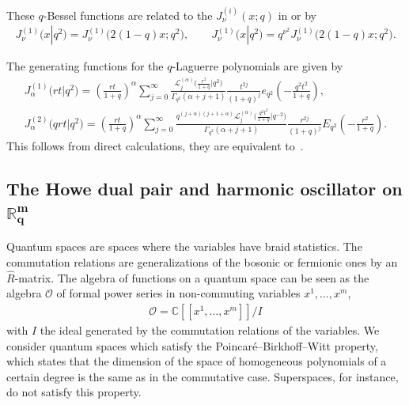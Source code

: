 \documentclass[pdftex]{sigma}
\newcommand{\mR}{\mathbb{R}}
\newcommand{\mC}{\mathbb{C}}
\newcommand{\cL}{\mathcal{L}}
\newcommand{\cO}{\mathcal{O}}
\numberwithin{equation}{section}
\begin{document}
These $q$-Bessel functions are related to the $J^{(i)}_\nu(x;q)$ in \cite[(1.13) and (1.17)]{MR0649849}  or \cite[Exercise~1.24]{MR1052153} by
\begin{gather*}
J^{(1)}_\nu\big(x|q^2\big)=J^{(1)}_\nu\big({2(1-q)}x;q^2\big),\qquad J^{(1)}_\nu\big(x|q^2\big)=q^{\nu^2}J^{(1)}_\nu\big(2(1-q)x;q^2\big).
\end{gather*}



The generating functions for the $q$-Laguerre polynomials are given by
\begin{gather}
\label{BesselLag1}
J_\alpha^{(1)}\big(rt|q^2\big) = \left(\frac{rt}{1+q}\right)^{\alpha}\sum_{j=0}^\infty\frac{\cL_j^{(\alpha)}\big(\frac{r^2}{1+q}|q^2\big)}{\Gamma_{q^2}(\alpha+j+1)}
\frac{t^{2j}}{(1+q)^j}e_{q^2}\left(-\frac{q^2t^2}{1+q}\right),\\
\label{BesselLag2}
J_\alpha^{(2)}\big(qrt|q^2\big) = \left(\frac{rt}{1+q}\right)^{\alpha}\sum_{j=0}^\infty\frac{q^{(j+\alpha)(j+1+\alpha)}\cL_j^{(\alpha)}
\big(\frac{q^2t^2}{1+q}|q^{-2}\big)}{\Gamma_{q^2}(\alpha+j+1)}\frac{r^{2j}}{(1+q)^j}E_{q^2}\left(-\frac{r^2}{1+q}\right).
\end{gather}
This follows from direct calculations, they are equivalent to~\cite[formulas~(3.20.11) and (3.21.13)]{Koekoek}.



\subsection[The Howe dual pair and harmonic oscillator on $\mR^m_q$]{The Howe dual pair and harmonic oscillator on $\boldsymbol{\mR^m_q}$}

Quantum spaces are spaces where the variables have braid statistics. The commutation relations are generalizations of the bosonic or fermionic ones by an $\hat{R}$-matrix. The algebra of functions on a quantum space can be seen as the algebra $\cO$ of formal power series in non-commuting variables $x^1,\dots,x^m$,
\begin{gather*}
\cO = \mC[[x^1,\dots,x^m]]/I
\end{gather*}
with $I$ the ideal generated by the commutation relations of the variables. We consider quantum spaces which satisfy the Poincar\'e--Birkhof\/f--Witt property, which states that the dimension of the space of homogeneous polynomials of a certain degree is the same as in the commutative case. Superspaces, for instance, do not satisfy this property.
\end{document}
